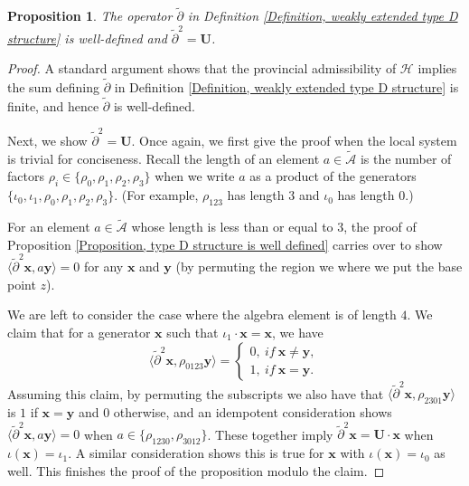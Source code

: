 \documentclass{amsart}
\newtheorem{prop}[thm]{Proposition}
\theoremstyle{definition}
\theoremstyle{remark}
\numberwithin{equation}{section}
\numberwithin{equation}{section} \makeatletter
\begin{document}
\begin{prop}\label{Proposition, weakly extended type D strucuture is well defined.}
The operator $\tilde{\partial}$ in Definition \ref{Definition, weakly extended type D structure} is well-defined and $\tilde{\partial}^2=\bm{U}$. 
\end{prop}
\begin{proof}
A standard argument shows that the provincial admissibility of $\mathcal{H}$ implies the sum defining $\tilde{\partial}$ in Definition \ref{Definition, weakly extended type D structure} is finite, and hence $\tilde{\partial}$ is well-defined. 

Next, we show $\tilde{\partial}^2=\bm{U}$. Once again, we first give the proof when the local system is trivial for conciseness. Recall the length of an element $a\in\tilde{\mathcal{A}}$ is the number of factors $\rho_i\in\{\rho_0,\rho_1,\rho_2,\rho_3\}$ when we write $a$ as a product of the generators $\{\iota_0,\iota_1,\rho_0,\rho_1,\rho_2,\rho_3\}$. (For example, $\rho_{123}$ has length $3$ and $\iota_0$ has length $0$.) 

For an element $a\in\tilde{\mathcal{A}}$ whose length is less than or equal to $3$, the proof of Proposition \ref{Proposition, type D structure is well defined} carries over to show $\langle \tilde{\partial}^2\bm{x}, a\bm{y}\rangle =0$ for any $\bm{x}$ and $\bm{y}$ (by permuting the region we where we put the base point $z$). 

We are left to consider the case where the algebra element is of length $4$. We claim that for a generator $\bm{x}$ such that $\iota_1\cdot \bm{x}=\bm{x}$, we have $$\langle\tilde{\partial}^2\bm{x}, \rho_{0123}\bm{y}\rangle=\begin{cases}0,\ if\  \bm{x}\neq\bm{y},\\1,\ if\ \bm{x}=\bm{y}.
\end{cases} $$
Assuming this claim, by permuting the subscripts we also have that $\langle\tilde{\partial}^2\bm{x}, \rho_{2301}\bm{y}\rangle$ is $1$ if $\bm{x}=\bm{y}$ and $0$ otherwise, and an idempotent consideration shows $\langle\tilde{\partial}^2\bm{x}, a\bm{y}\rangle=0$ when $a\in\{\rho_{1230},\rho_{3012}\}$. These together imply $\tilde{\partial}^2\bm{x}=\bm{U}\cdot \bm{x}$ when $\iota(\bm{x})=\iota_1$. A similar consideration shows this is true for $\bm{x}$ with $\iota(\bm{x})=\iota_0$ as well. This finishes the proof of the proposition modulo the claim. 


\end{proof}
\end{document}
